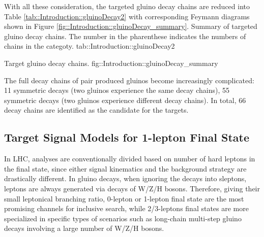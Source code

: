 With all these consideration, the targeted gluino decay chains are reduced into Table \ref{tab::Introduction::gluinoDecay2}
with corresponding Feymann diagrams shown in Figure \ref{fig::Introduction::gluinoDecay_summary}. 
{Summary of targeted gluino decay chains. The number in the pharenthese indicates the numbers of chains in the categoty.}
{tab::Introduction::gluinoDecay2}


{Target gluino decay chains.}
{fig::Introduction::gluinoDecay_summary}


The full decay chains of pair produced gluinos become increasingly complicated: 11 symmetric decays (two gluinos experience the same decay chains), 55 symmetric decays (two gluinos experience different decay chains).
In total, 66 decay chains are identified as the candidate for the targets. \\

\subsection{Target Signal Models for 1-lepton Final State}
In LHC, analyses are conventionally divided based on number of hard leptons in the final state, since either signal kinematics and the background strategy are drastically different. In gluino decays, when ignoring the decays into sleptons, leptons are always generated via decays of W/Z/H bosons. Therefore, giving their small leptonical branching ratio, 0-lepton or 1-lepton final state are the most promising channels for inclusive search, while 2/3-leptons final states are more specialized in specific types of scenarios such as long-chain multi-step gluino decays involving a large number of W/Z/H bosons. \\


